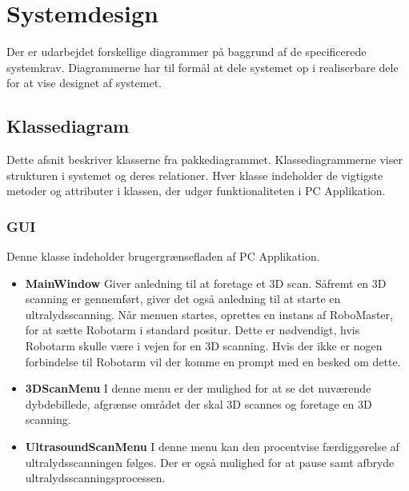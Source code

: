 \chapter{Systemdesign}\label{Systemdesign}
Der er udarbejdet forskellige diagrammer på baggrund af de specificerede systemkrav.  Diagrammerne har til formål at dele systemet op i realiserbare dele for at vise designet af systemet. 

\section{Klassediagram} \label{Klassediagram}
Dette afsnit beskriver klasserne fra pakkediagrammet. Klassediagrammerne viser strukturen i systemet og deres relationer. Hver klasse indeholder de vigtigste metoder og attributer i klassen, der udgør funktionaliteten i PC Applikation. 

\subsection{GUI}
Denne klasse indeholder brugergrænsefladen af PC Applikation.

\let\labelitemi\labelitemii
\begin{itemize}
\item{\textbf{MainWindow}}\newline
Giver anledning til at foretage et 3D scan. Såfremt en 3D scanning er gennemført, giver det også anledning til at starte en ultralydsscanning.
Når menuen startes, oprettes en instans af RoboMaster, for at sætte Robotarm i standard positur. Dette er nødvendigt, hvis Robotarm skulle være i vejen for en 3D scanning.
Hvis der ikke er nogen forbindelse til Robotarm vil der komme en prompt med en besked om dette. 

\item{\textbf{3DScanMenu}}\newline
I denne menu er der mulighed for at se det nuværende dybdebillede, afgrænse området der skal 3D scannes og foretage en 3D scanning.

\item{\textbf{UltrasoundScanMenu}}\newline
I denne menu kan den procentvise færdiggørelse af ultralydsscanningen følges. Der er også mulighed for at pause samt afbryde ultralydsscanningsprocessen.
\end{itemize}

